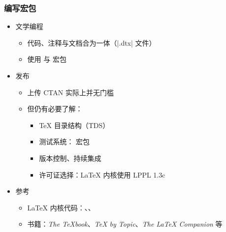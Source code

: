 \begin{frame}[fragile]
\frametitle{编写宏包}
\begin{itemize}
  \item 文学编程
    \begin{itemize}
      \item 代码、注释与文档合为一体（|.dtx| 文件）
      \item 使用  与  宏包
    \end{itemize}
  \item 发布
    \begin{itemize}
      \item 上传 CTAN 实际上并无门槛
      \item 但仍有必要了解：
        \begin{itemize}
          \item \TeX{} 目录结构（TDS）
          \item 测试系统： 宏包
          \item 版本控制、持续集成
          \item 许可证选择：\LaTeX{} 内核使用 LPPL 1.3c
        \end{itemize}
    \end{itemize}
  \item 参考
    \begin{itemize}
      \item \LaTeX{} 内核代码：、、
      \item 书籍：\emph{The \TeX book}、\emph{\TeX{} by Topic}、\emph{The \LaTeX{} Companion} 等
    \end{itemize}
\end{itemize}
\end{frame}

